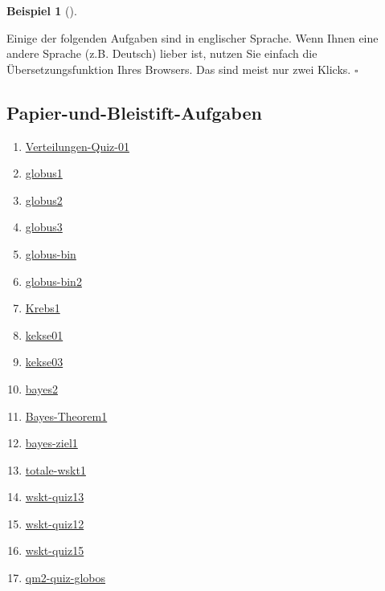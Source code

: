 \documentclass[
  ngerman,
  letterpaper,
  twoside,
  open=any]{scrbook}
\providecommand{\tightlist}{%
  \setlength{\itemsep}{0pt}\setlength{\parskip}{0pt}}\usepackage{longtable,booktabs,array}
\theoremstyle{definition}
\newtheorem{example}{Beispiel}[chapter]
\theoremstyle{plain}
\theoremstyle{definition}
\theoremstyle{definition}
\theoremstyle{remark}
\begin{document}
\begin{example}[]
\begin{tcolorbox}
Einige der folgenden Aufgaben sind in englischer Sprache. Wenn Ihnen
eine andere Sprache (z.B. Deutsch) lieber ist, nutzen Sie einfach die
Übersetzungsfunktion Ihres Browsers. Das sind meist nur zwei Klicks.
\(\square\)

\end{tcolorbox}

\subsection{Papier-und-Bleistift-Aufgaben}\label{papier-und-bleistift-aufgaben}

\begin{enumerate}
\def\labelenumi{\arabic{enumi}.}
\tightlist
\item
  \href{https://datenwerk.netlify.app/posts/verteilungen-quiz-01/verteilungen-quiz-01}{Verteilungen-Quiz-01}
\item
  \href{https://datenwerk.netlify.app/posts/globus1/index.html}{globus1}
\item
  \href{https://datenwerk.netlify.app/posts/globus2/index.html}{globus2}
\item
  \href{https://datenwerk.netlify.app/posts/globus3/index.html}{globus3}
\item
  \href{https://datenwerk.netlify.app/posts/globus-bin/index.html}{globus-bin}
\item
  \href{https://datenwerk.netlify.app/posts/globus-bin2/index.html}{globus-bin2}
\item
  \href{https://datenwerk.netlify.app/posts/krebs1/krebs1}{Krebs1}
\item
  \href{https://datenwerk.netlify.app/posts/kekse01/kekse01}{kekse01}
\item
  \href{https://datenwerk.netlify.app/posts/kekse03/index.html}{kekse03}
\item
  \href{https://datenwerk.netlify.app/posts/bayes2/bayes2}{bayes2}
\item
  \href{https://datenwerk.netlify.app/posts/bayes-theorem1/bayes-theorem1}{Bayes-Theorem1}
\item
  \href{https://datenwerk.netlify.app/posts/bayes-ziel1/bayes-ziel1}{bayes-ziel1}
\item
  \href{https://datenwerk.netlify.app/posts/totale-wskt1/totale-wskt1.html}{totale-wskt1}
\item
  \href{https://datenwerk.netlify.app/posts/wskt-quiz13/wskt-quiz13}{wskt-quiz13}
\item
  \href{https://datenwerk.netlify.app/posts/wskt-quiz12/wskt-quiz12}{wskt-quiz12}
\item
  \href{https://datenwerk.netlify.app/posts/wskt-quiz15/wskt-quiz15}{wskt-quiz15}
\item
  \href{https://sebastiansauer.github.io/datenwerk/posts/qm2-quiz-globus/}{qm2-quiz-globos}
\end{enumerate}


\end{example}
\end{document}
